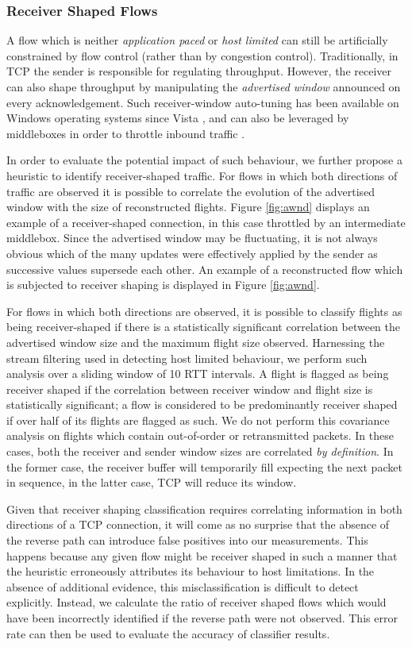 \subsubsection{Receiver Shaped Flows}
\label{sssec:rec}

A flow which is neither \emph{application paced} or \emph{host limited} can still be artificially constrained by flow control (rather than by congestion control).
Traditionally, in TCP the sender is responsible for regulating throughput. However, the receiver can also shape throughput by manipulating the \emph{advertised window} announced on every acknowledgement.
Such receiver-window auto-tuning has been available on Windows operating systems since Vista \cite{vistaReceiveWindow}, and can also be leveraged by middleboxes in order to throttle inbound traffic \cite{appEx}.

In order to evaluate the potential impact of such behaviour, we further propose a heuristic to identify receiver-shaped traffic.
For flows in which both directions of traffic are observed it is possible to correlate the evolution of the advertised window with the size of reconstructed flights.
Figure \ref{fig:awnd} displays an example of a receiver-shaped connection, in this case throttled by an intermediate middlebox.
Since the advertised window may be fluctuating, it is not always obvious which of the many updates were effectively applied by the sender as successive values supersede each other.
An example of a reconstructed flow which is subjected to receiver shaping is displayed in Figure \ref{fig:awnd}.

For flows in which both directions are observed, it is possible to classify flights as being receiver-shaped if there is a statistically significant correlation between the advertised window size and the maximum flight size observed.
Harnessing the stream filtering used in detecting host limited behaviour, we perform such analysis over a sliding window of 10 RTT intervals.
A flight is flagged as being receiver shaped if the correlation between receiver window and flight size is statistically significant; a flow is considered to be predominantly receiver shaped if over half of its flights are flagged as such.
We do not perform this covariance analysis on flights which contain out-of-order or retransmitted packets. In these cases, both the receiver and sender window sizes are correlated \emph{by definition}. In the former case, the receiver buffer will temporarily fill expecting the next packet in sequence, in the latter case, TCP will reduce its window.

Given that receiver shaping classification requires correlating information in both directions of a TCP connection, it will come as no surprise that the absence of the reverse path can introduce false positives into our measurements. This happens because any given flow might be receiver shaped in such a manner that the heuristic erroneously attributes its behaviour to host limitations. In the absence of additional evidence, this misclassification is difficult to detect explicitly. Instead, we calculate the ratio of receiver shaped flows which would have been incorrectly identified if the reverse path were not observed. This error rate can then be used to evaluate the accuracy of classifier results.


